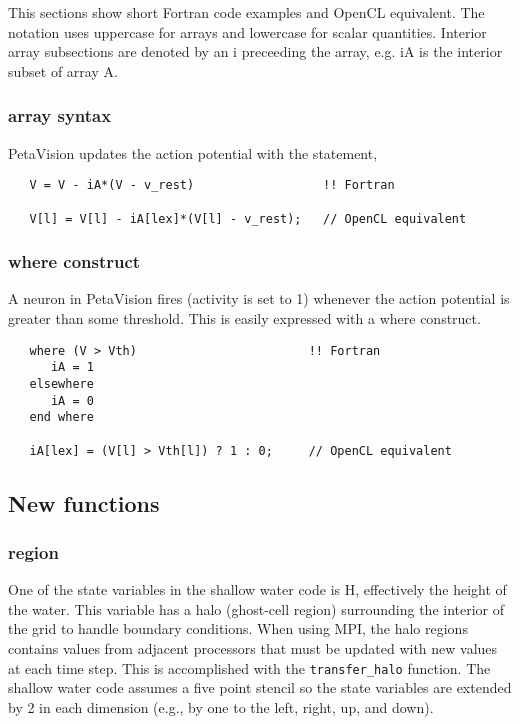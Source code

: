 \documentclass[10pt, conference, compsocconf]{IEEEtran}
\begin{document}
This sections show short Fortran code examples and OpenCL equivalent.
The notation uses uppercase for arrays and lowercase for scalar quantities.
Interior array subsections are denoted by an i preceeding the array, e.g. iA
is the interior subset of array A.

\subsubsection{array syntax}

PetaVision updates the action potential with the statement,

\begin{verbatim}
   V = V - iA*(V - v_rest)                  !! Fortran

   V[l] = V[l] - iA[lex]*(V[l] - v_rest);   // OpenCL equivalent
\end{verbatim}

\subsubsection{where construct}

A neuron in PetaVision fires (activity is set to 1)
whenever the action potential is greater than some threshold.
This is easily expressed with a where construct.

\begin{verbatim}
   where (V > Vth)                        !! Fortran
      iA = 1
   elsewhere
      iA = 0
   end where

   iA[lex] = (V[l] > Vth[l]) ? 1 : 0;     // OpenCL equivalent
\end{verbatim}

\subsection{New functions}

\subsubsection{region}

One of the state variables in the shallow water code is H, effectively the
height of the water.  This variable has a halo (ghost-cell region) surrounding
the interior of the grid to handle boundary conditions.  When using
MPI, the halo regions contains values from adjacent processors that must be
updated with new values at each time step.  This is accomplished with the
{\tt transfer\_halo} function.  The shallow water code assumes a five point stencil
so the state variables are extended by 2 in each dimension (e.g., by one to the
left, right, up, and down).
\end{document}
